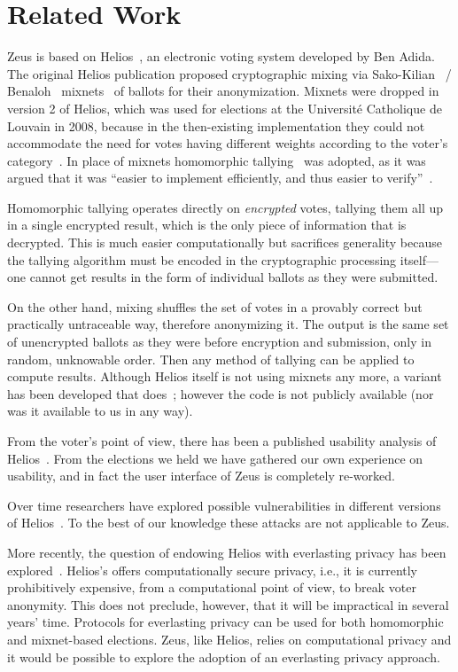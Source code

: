 \documentclass[letterpaper,10pt]{article}
\begin{document}
\section{Related Work}
\label{sec:related}

Zeus is based on Helios~\cite{adida:2008}, an electronic voting system
developed by Ben Adida. The original Helios publication
\cite{adida:2008} proposed cryptographic mixing via
Sako-Kilian~\cite{sako:1995} / Benaloh~\cite{benaloh:2006}
mixnets~\cite{sako:1995} of ballots for their anonymization. Mixnets
were dropped in version 2 of Helios, which was used for elections at
the Universit\'{e} Catholique de Louvain in 2008, because in the
then-existing implementation they could not accommodate the need for
votes having different weights according to the voter's
category~\cite{adida:2009}. In place of mixnets homomorphic
tallying~\cite{cohen:1985} was adopted, as it was argued that it was
``easier to implement efficiently, and thus easier to
verify''~\cite{adida:2009}.

Homomorphic tallying operates directly on \emph{encrypted} votes,
tallying them all up in a single encrypted result, which is the only
piece of information that is decrypted. This is much easier
computationally but sacrifices generality because the tallying
algorithm must be encoded in the cryptographic processing itself---one
cannot get results in the form of individual ballots as they were
submitted.

On the other hand, mixing shuffles the set of votes in a provably
correct but practically untraceable way, therefore anonymizing it. The
output is the same set of unencrypted ballots as they were before
encryption and submission, only in random, unknowable order. Then any
method of tallying can be applied to compute results. Although Helios
itself is not using mixnets any more, a variant has been developed
that does~\cite{bulens:2011}; however the code is not publicly
available (nor was it available to us in any way).

From the voter's point of view, there has been a published usability
analysis of Helios~\cite{karayumak:2011}. From the elections we held
we have gathered our own experience on usability, and in fact the user
interface of Zeus is completely re-worked.

Over time researchers have explored possible vulnerabilities in
different versions of Helios~\cite{heiderich:2011}. To the best of our
knowledge these attacks are not applicable to Zeus.

More recently, the question of endowing Helios with everlasting
privacy has been explored~\cite{demirel:2012}. Helios's offers
computationally secure privacy, i.e., it is currently prohibitively
expensive, from a computational point of view, to break voter
anonymity. This does not preclude, however, that it will be
impractical in several years' time. Protocols for everlasting privacy
can be used for both homomorphic and mixnet-based elections. Zeus,
like Helios, relies on computational privacy and it would be possible
to explore the adoption of an everlasting privacy approach.
\end{document}
